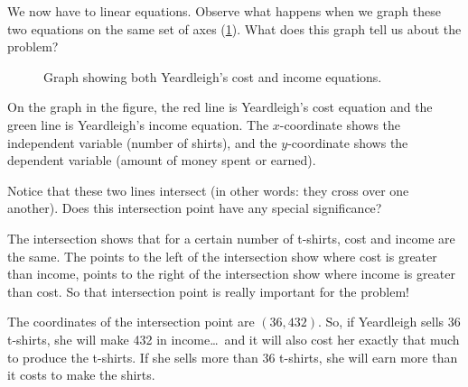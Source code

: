 We now have to linear equations. Observe what happens when we graph these two equations on the same set of axes (\cref{fig:tshirts}). What does this graph tell us about the problem?

\begin{figure}[!htbp]
\centering
{}
\caption{Graph showing both Yeardleigh's cost and income equations.}
\label{fig:tshirts}
\end{figure}

On the graph in the figure, the red line is Yeardleigh's cost equation and the green line is Yeardleigh's income equation. The $x$-coordinate shows the independent variable (number of shirts), and the $y$-coordinate shows the dependent variable (amount of money spent or earned).

Notice that these two lines intersect (in other words: they cross over one another). Does this intersection point have any special significance?

The intersection shows that for a certain number of t-shirts, cost and income are the same. The points to the left of the intersection show where cost is greater than income, points to the right of the intersection show where income is greater than cost. So that intersection point is really important for the problem!

The coordinates of the intersection point are $(36, 432)$. So, if Yeardleigh sells 36 t-shirts, she will make 432 in income\ldots\ and it will also cost her exactly that much to produce the t-shirts. If she sells more than 36 t-shirts, she will earn more than it costs to make the shirts.

